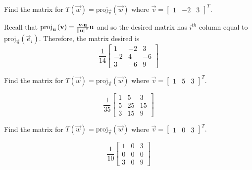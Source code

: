 \documentclass{ximera}
\begin{document}
\begin{problem}\label{prb:10.101}  Find the matrix for $T\left(\vec{w} \right) = \mbox{proj}_{\vec{v}}\left( \vec{w}\right) $
where $\vec{v}=\left[
\begin{array}{rrr}
1 & -2 & 3
\end{array}
\right] ^{T}.$
\begin{hint}
 Recall that $\mbox{proj}_{\mathbf{u}}\left( \mathbf{v}\right) =\frac{\mathbf{v}\cdot\mathbf{u} }{\left\lVert\mathbf{u}\right\rVert^{2}}\mathbf{u}$ and so the desired matrix
has $i^{th}$ column equal to $\mbox{proj}_{\vec{u}}\left( \vec{e}_{i}\right) .$ Therefore, the matrix desired is
\[
\frac{1}{14}\left[
\begin{array}{rrr}
1 & -2 & 3 \\
-2 & 4 & -6 \\
3 & -6 & 9
\end{array}
\right]
\]
\end{hint}
\end{problem}

\begin{problem}\label{prb:10.102}  Find the matrix for $T\left(\vec{w} \right) = \mbox{proj}_{\vec{v}}\left( \vec{w}\right) $
where $\vec{v}=\left[
\begin{array}{rrr}
1 & 5 & 3
\end{array}
\right] ^{T}.$
\begin{hint}
\[
\frac{1}{35}\left[
\begin{array}{rrr}
1 & 5 & 3 \\
5 & 25 & 15 \\
3 & 15 & 9
\end{array}
\right]
\]
\end{hint}
\end{problem}

\begin{problem}\label{prb:10.103} Find the matrix for $T\left(\vec{w} \right) = \mbox{proj}_{\vec{v}}\left( \vec{w}\right) $
where $\vec{v}=\left[
\begin{array}{rrr}
1 & 0 & 3
\end{array}
\right] ^{T}.$
\begin{hint}
\[
\frac{1}{10}\left[
\begin{array}{ccc}
1 & 0 & 3 \\
0 & 0 & 0 \\
3 & 0 & 9
\end{array}
\right]
\]
\end{hint}
\end{problem}
\end{document}
